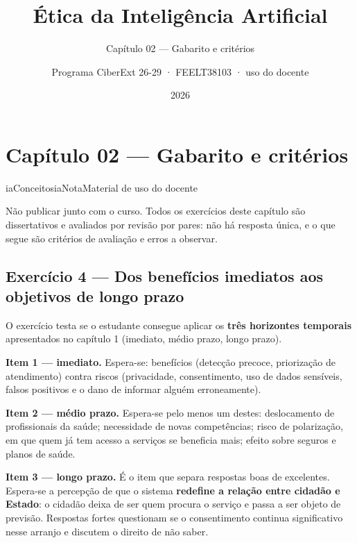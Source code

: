 \documentclass[
  11pt,
]{article}
\title{Ética da Inteligência Artificial}
\subtitle{Capítulo 02 --- Gabarito e critérios}
\author{Programa CiberExt 26-29 · FEELT38103 · uso do docente}
\date{2026}
\newenvironment{nota}[1][Nota]{\begin{iabox}{iaConceitos}{iaNota}{#1}}{\end{iabox}}
\begin{document}
\maketitle

{
\hypersetup{linkcolor=iaConceitos}
\setcounter{tocdepth}{2}
\tableofcontents
}
\hypertarget{capuxedtulo-02-gabarito-e-crituxe9rios}{%
\section{Capítulo 02 --- Gabarito e
critérios}\label{capuxedtulo-02-gabarito-e-crituxe9rios}}

\begin{nota}[Material de uso do docente]

Não publicar junto com o curso. Todos os exercícios deste capítulo são
dissertativos e avaliados por revisão por pares: não há resposta única,
e o que segue são critérios de avaliação e erros a observar.

\end{nota}

\hypertarget{exercuxedcio-4-dos-benefuxedcios-imediatos-aos-objetivos-de-longo-prazo}{%
\subsection{Exercício 4 --- Dos benefícios imediatos aos objetivos de
longo
prazo}\label{exercuxedcio-4-dos-benefuxedcios-imediatos-aos-objetivos-de-longo-prazo}}

O exercício testa se o estudante consegue aplicar os \textbf{três
horizontes temporais} apresentados no capítulo 1 (imediato, médio prazo,
longo prazo).

\textbf{Item 1 --- imediato.} Espera-se: benefícios (detecção precoce,
priorização de atendimento) contra riscos (privacidade, consentimento,
uso de dados sensíveis, falsos positivos e o dano de informar alguém
erroneamente).

\textbf{Item 2 --- médio prazo.} Espera-se pelo menos um destes:
deslocamento de profissionais da saúde; necessidade de novas
competências; risco de polarização, em que quem já tem acesso a serviços
se beneficia mais; efeito sobre seguros e planos de saúde.

\textbf{Item 3 --- longo prazo.} É o item que separa respostas boas de
excelentes. Espera-se a percepção de que o sistema \textbf{redefine a
relação entre cidadão e Estado}: o cidadão deixa de ser quem procura o
serviço e passa a ser objeto de previsão. Respostas fortes questionam se
o consentimento continua significativo nesse arranjo e discutem o
direito de não saber.
\end{document}
